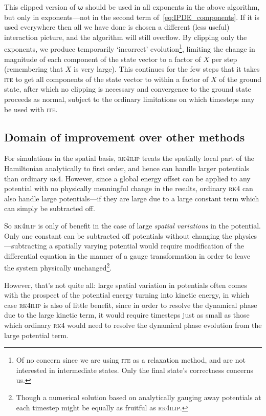 This clipped version of $\mathbf{\omega}$ should be used in all exponents in the above algorithm, but only in exponents---not in the second term of~\eqref{eq:IPDE_components}. If it is used everywhere then all we have done is chosen a different (less useful) interaction picture, and the algorithm will still overflow. By clipping only the exponents, we produce temporarily `incorrect' evolution\footnote{Of no concern since we are using \textsc{ite} as a relaxation method, and are not interested in intermediate states. Only the final state's correctness concerns us.}, limiting the change in magnitude of each component of the state vector to a factor of $X$ per step (remembering that $X$ is very large). This continues for the few steps that it takes \textsc{ite} to get all components of the state vector to within a factor of $X$ of the ground state, after which no clipping is necessary and convergence to the ground state proceeds as normal, subject to the ordinary limitations on which timesteps may be used with \textsc{ite}.

\subsection{Domain of improvement over other methods}

For simulations in the spatial basis, \textsc{rk4ilip} treats the spatially local part of the Hamiltonian analytically to first order, and hence can handle larger potentials than ordinary \textsc{rk4}. However, since a global energy offset can be applied to any potential with no physically meaningful change in the results, ordinary \textsc{rk4} can also handle large potentials---if they are large due to a large constant term which can simply be subtracted off.

So \textsc{rk4ilip} is only of benefit in the case of large \emph{spatial variations} in the potential. Only one constant can be subtracted off potentials without changing the physics---subtracting a spatially varying potential would require modification of the differential equation in the manner of a gauge transformation in order to leave the system physically unchanged\footnote{Though a numerical solution based on analytically gauging away potentials at each timestep might be equally as fruitful as \textsc{rk4ilip}.}.

However, that's not quite all: large spatial variation in potentials often comes with the prospect of the potential energy turning into kinetic energy, in which case \textsc{rk4ilip} is also of little benefit, since in order to resolve the dynamical phase due to the large kinetic term, it would require timesteps just as small as those which ordinary \textsc{rk4} would need to resolve the dynamical phase evolution from the large potential term.

